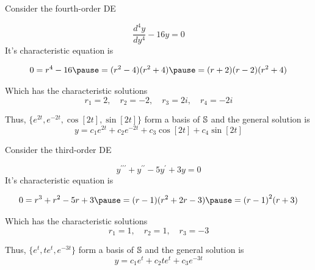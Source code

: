 \documentclass{beamer}
\begin{document}
\begin{frame}
\begin{example}
Consider the fourth-order DE

\vspace{-1mm}
\begin{equation*}
\dfrac{d^4 y}{dy^4}-16y=0
\end{equation*}\pause
It's characteristic equation is

\vspace{-1mm}
\begin{equation*}
\begin{aligned}
0=r^4-16\pause
=(r^2-4)(r^2+4)\pause
=(r+2)(r-2)(r^2+4)
\end{aligned}
\end{equation*}\pause

\vspace{-3mm}
Which has the characteristic solutions
\begin{equation*}
r_1 = 2  , \quad r_2  = -2 , \quad r_3 = 2i , \quad r_4  = -2i
\end{equation*}\pause

\vspace{-3mm}
Thus, $\{e^{2t},e^{-2t},\cos[2t],\sin[2t]\}$ form a basis of $\mathbb{S}$ and the general solution is
\begin{equation*}
y=c_1e^{2t}+c_2e^{-2t}+c_3\cos[2t]+c_4\sin[2t]
\end{equation*}
\end{example}
\end{frame}

\begin{frame}
\begin{example}
Consider the third-order DE

\vspace{-1mm}
\begin{equation*}
y^{\prime\prime\prime}+y^{\prime\prime}-5y^{\prime}+3y=0
\end{equation*}\pause
It's characteristic equation is

\vspace{-1mm}
\begin{equation*}
\begin{aligned}
0=r^3+r^2-5r+3\pause
=(r-1)(r^2+2r-3)\pause
={(r-1)}^2(r+3)
\end{aligned}
\end{equation*}\pause

\vspace{-3mm}
Which has the characteristic solutions
\begin{equation*}
r_1=1, \quad r_2=1, \quad r_3=-3
\end{equation*}\pause

\vspace{-3mm}
Thus, $\{e^{t},te^{t},e^{-3t}\}$ form a basis of $\mathbb{S}$ and the general solution is
\begin{equation*}
y=c_1e^{t}+c_2te^{t}+c_3e^{-3t}
\end{equation*}
\end{example}
\end{frame}
\end{document}
